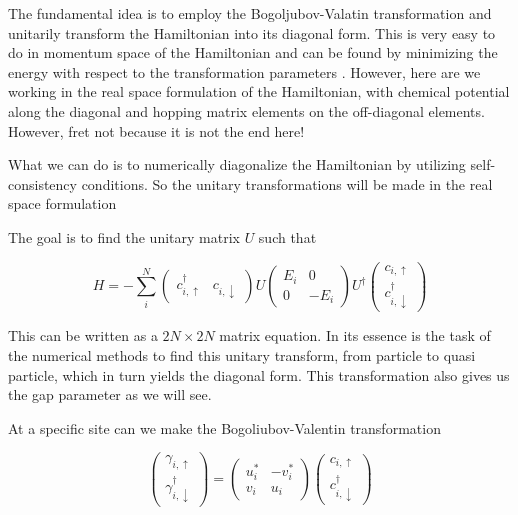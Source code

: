 \documentclass[11pt]{article}
\begin{document}
The fundamental idea is to employ the Bogoljubov-Valatin transformation and unitarily transform the Hamiltonian into its diagonal form. This is very easy to do in momentum space of the Hamiltonian and can be found by minimizing the energy with respect to the transformation parameters \cite{annettSuperconductivitySuperfluidsCondensates2004}. However, here are we working in the real space formulation of the Hamiltonian, with chemical potential along the diagonal and hopping matrix elements on the off-diagonal elements. However, fret not because it is not the end here! 
 
What we can do is to numerically diagonalize the Hamiltonian by utilizing self-consistency conditions. So the unitary transformations will be made in the real space formulation 

The goal is to find the unitary matrix $U$ such that

\begin{equation}
	H = - \sum_{i}^{N} \begin{pmatrix} c_{i, \uparrow}^\dagger &  c_{i, \downarrow} \end{pmatrix} U \begin{pmatrix} E_i & 0 \\ 0 & -E_i \end{pmatrix} U^\dagger  \begin{pmatrix} c_{i, \uparrow} \\  c_{i, \downarrow}^\dagger \end{pmatrix}
\end{equation}

This can be written as a $2N \times 2N$ matrix equation. In its essence is the task of the numerical methods to find this unitary transform, from particle to quasi particle, which in turn yields the diagonal form. This transformation also gives us the gap parameter as we will see. 

At a specific site can we make the Bogoliubov-Valentin transformation

\begin{equation}\label{eq:BV-transformation}
	\begin{pmatrix} \gamma_{i,\uparrow} \\ \gamma_{i, \downarrow}^\dagger \end{pmatrix} = \begin{pmatrix} u_i^{*} & -v_i^* \\ v_i & u_i \end{pmatrix} \begin{pmatrix} c_{i,\uparrow} \\ c_{i,\downarrow}^\dagger \end{pmatrix} 
\end{equation}
\end{document}
